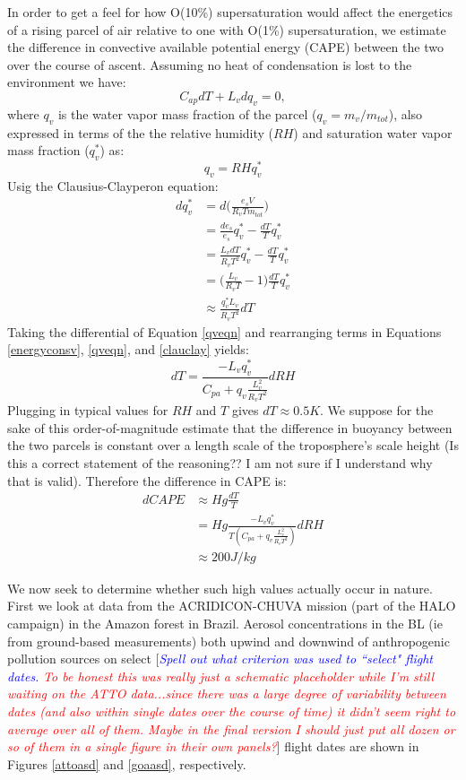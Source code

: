 \documentclass{article}
\newcommand{\drcomm}[1]{\textcolor{blue}{\textit{#1}}}
\newcommand{\klcomm}[1]{\textcolor{red}{\textit{#1}}}
\begin{document}
In order to get a feel for how O(10\%) supersaturation would affect the energetics of a rising parcel of air relative to one with O(1\%) supersaturation, we estimate the difference in convective available potential energy (CAPE) between the two over the course of ascent. Assuming no heat of condensation is lost to the environment we have:
\begin{equation}
\label{energyconsv}
C_{ap}dT + L_vdq_v = 0,
\end{equation}
where $q_v$ is the water vapor mass fraction of the parcel ($q_v=m_v/m_{tot}$), also expressed in terms of the the relative humidity ($RH$) and saturation water vapor mass fraction ($q_v^*$) as:
\begin{equation}
\label{qveqn}
q_v = RHq_v^*
\end{equation}
Usig the Clausius-Clayperon equation:
\begin{align}
\label{clauclay}
dq_v^* &= d\Big(\frac{e_sV}{R_vTm_{tot}}\Big)\nonumber\\
&=\frac{de_s}{e_s}q_v^* - \frac{dT}{T}q_v^*\nonumber\\
&=\frac{L_vdT}{R_vT^2}q_v^* - \frac{dT}{T}q_v^*\nonumber\\
&=\Big(\frac{L_v}{R_vT} - 1\Big)\frac{dT}{T}q_v^*\nonumber\\
&\approx \frac{q_v^*L_v}{R_vT^2}dT
\end{align}
Taking the differential of Equation \ref{qveqn} and rearranging terms in Equations \ref{energyconsv}, \ref{qveqn}, and \ref{clauclay} yields:
\begin{equation}
dT = \frac{-L_vq_v^*}{C_{pa} + q_v\frac{L_v^2}{R_vT^2}}dRH
\end{equation}
Plugging in typical values for $RH$ and $T$ gives $dT\approx 0.5K$. We suppose for the sake of this order-of-magnitude estimate that the difference in buoyancy between the two parcels is constant over a length scale of the troposphere's scale height (Is this a correct statement of the reasoning?? I am not sure if I understand why that is valid). Therefore the difference in CAPE is:
\begin{align}
dCAPE &\approx Hg \frac{dT}{T}\nonumber\\
&=Hg\frac{-L_vq_v^*}{T(C_{pa} + q_v\frac{L_v^2}{R_vT^2})}dRH\nonumber\\
&\approx 200 J/kg
\end{align}

We now seek to determine whether such high values actually occur in nature. First we look at data from the ACRIDICON-CHUVA mission (part of the HALO campaign) in the Amazon forest in Brazil. Aerosol concentrations in the BL (ie from ground-based measurements) both upwind and downwind of anthropogenic pollution sources on select [\drcomm{Spell out what criterion was used to ``select" flight dates.} \klcomm{To be honest this was really just a schematic placeholder while I'm still waiting on the ATTO data...since there was a large degree of variability between dates (and also within single dates over the course of time) it didn't seem right to average over all of them. Maybe in the final version I should just put all dozen or so of them in a single figure in their own panels?}] flight dates are shown in Figures \ref{attoasd} and \ref{goaasd}, respectively.
\end{document}
